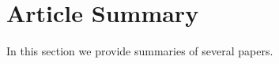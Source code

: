 \section{Article Summary}
\label{sec:articlesummary}

In this section we provide summaries of several papers.

\subsection{\cite{devlin-etal-2019-bert}}
\label{subsec:devlin-etal}

\subsection{\cite{nie2019adversarial}}
\label{subsec:nie2019adversarial}

\subsection{\cite{michel2019sixteen}}
\label{subsec:michel2019sixteen}

\subsection{\cite{rogers2020primer}}
\label{subsec:rogers2020primer}

\subsection{\cite{clark2019does}}
\label{subsec:clark2019does}

\subsection{\cite{vaswani2017attention}}
\label{subsec:vaswani2017attention}

\subsection{\cite{mccoy2019right}}
\label{subsec:mccoy2019right}
